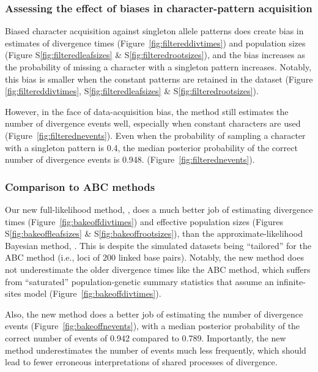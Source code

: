 \subsubsection{Assessing the effect of biases in character-pattern acquisition}

Biased character acquisition against singleton allele patterns does create
bias in estimates of divergence times
(Figure~\ref{fig:filtereddivtimes}) and
population sizes
(Figure
S\ref{fig:filteredleafsizes}
\&
S\ref{fig:filteredrootsizes}), and the bias increases as the probability of
missing a character with a singleton pattern increases.
Notably, this bias is smaller when the constant patterns are retained in
the dataset
(Figure
\ref{fig:filtereddivtimes},
S\ref{fig:filteredleafsizes}
\&
S\ref{fig:filteredrootsizes}).

However, in the face of data-acquisition bias, the method still estimates the
number of divergence events well, especially when constant characters are used
(Figure~\ref{fig:filterednevents}).
Even when the probability of sampling a character with a singleton pattern is
0.4, the median posterior probability of the correct number of divergence
events is 0.948.
(Figure~\ref{fig:filterednevents}).


\subsubsection{Comparison to ABC methods}

Our new full-likelihood method, \ecoevolity, does a much better job of
estimating divergence times
(Figure~\ref{fig:bakeoffdivtimes})
and effective population sizes
(Figures
S\ref{fig:bakeoffleafsizes}
\&
S\ref{fig:bakeoffrootsizes}),
than the approximate-likelihood Bayesian method, \dppmsbayes.
This is despite the simulated datasets being ``tailored'' for the ABC method
(i.e., loci of 200 linked base pairs).
Notably, the new method does not underestimate the older divergence times like
the ABC method, which suffers from ``saturated'' population-genetic summary
statistics that assume an infinite-sites model
(Figure~\ref{fig:bakeoffdivtimes}).

Also, the new method does a better job of estimating the number of divergence
events (Figure~\ref{fig:bakeoffnevents}), with a median posterior probability
of the correct number of events of 0.942 compared to 0.789.
Importantly, the new method underestimates the number of events much less
frequently,
which should lead to fewer erroneous interpretations of shared processes of
divergence.


